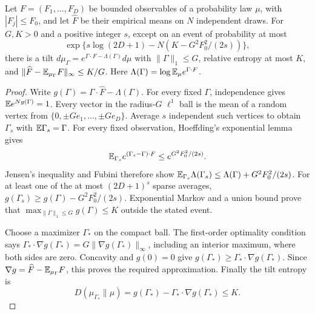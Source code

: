 \begin{lemma}
\label{lem:sparse-tilt}
Let $F=(F_1,\ldots,F_D)$ be bounded observables of a probability law
$\mu$, with $|F_j|\le F_0$, and let $\widehat F$ be their empirical
means on $N$ independent draws. For $G,K>0$ and a positive integer $s$,
except on an event of probability at most
\[
 \exp\{s\log(2D+1)-N(K-G^2F_0^2/(2s))\},
\]
there is a tilt $d\mu_\Gamma=e^{\Gamma\cdot F-\Lambda(\Gamma)}d\mu$
with $\|\Gamma\|_1\le G$, relative entropy at most $K$, and
$\|\widehat F-\mathbb E_{\mu_\Gamma}F\|_\infty\le K/G$.
Here $\Lambda(\Gamma)=\log\mathbb E_\mu e^{\Gamma\cdot F}$.
\end{lemma}
\begin{proof}
Write $g(\Gamma)=\Gamma\cdot\widehat F-\Lambda(\Gamma)$.
For every fixed $\Gamma$, independence gives $\mathbb E e^{Ng(\Gamma)}=1$.
Every vector in the radius-$G$ $\ell^1$ ball is the mean of a random
vertex from $\{0,\pm Ge_1,\ldots,\pm Ge_D\}$. Average $s$ independent
such vertices to obtain $\Gamma_s$ with $\mathbb E\Gamma_s=\Gamma$.
For every fixed observation, Hoeffding's exponential lemma gives
\[
 \mathbb E_{\Gamma_s}e^{(\Gamma_s-\Gamma)\cdot F}
 \le e^{G^2F_0^2/(2s)}.
\]
Jensen's inequality and Fubini therefore show
$\mathbb E_{\Gamma_s}\Lambda(\Gamma_s)\le\Lambda(\Gamma)+G^2F_0^2/(2s)$.
For at least one of the at most $(2D+1)^s$ sparse averages,
$g(\Gamma_s)\ge g(\Gamma)-G^2F_0^2/(2s)$.
Exponential Markov and a union bound prove that
$\max_{\|\Gamma\|_1\le G}g(\Gamma)\le K$ outside the stated event.

Choose a maximizer $\Gamma_*$ on the compact ball. The first-order
optimality condition says
$\Gamma_*\cdot\nabla g(\Gamma_*)=G\|\nabla g(\Gamma_*)\|_\infty$,
including an interior maximum, where both sides are zero.
Concavity and $g(0)=0$ give
$g(\Gamma_*)\ge\Gamma_*\cdot\nabla g(\Gamma_*)$.
Since $\nabla g=\widehat F-\mathbb E_{\mu_\Gamma}F$, this proves the required
approximation. Finally the tilt entropy is
\[
 D(\mu_{\Gamma_*}\|\mu)
 =g(\Gamma_*)-\Gamma_*\cdot\nabla g(\Gamma_*)\le K.
\]
\end{proof}

